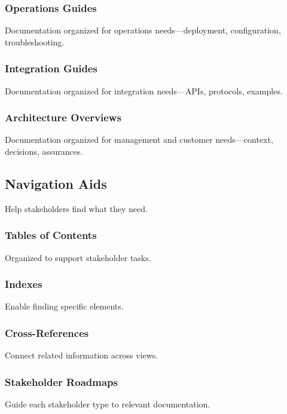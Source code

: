 \documentclass[11pt]{article}
\begin{document}
\subsubsection{Operations Guides}

Documentation organized for operations needs---deployment, configuration, troubleshooting.

\subsubsection{Integration Guides}

Documentation organized for integration needs---APIs, protocols, examples.

\subsubsection{Architecture Overviews}

Documentation organized for management and customer needs---context, decisions, assurances.

\subsection{Navigation Aids}

Help stakeholders find what they need.

\subsubsection{Tables of Contents}

Organized to support stakeholder tasks.

\subsubsection{Indexes}

Enable finding specific elements.

\subsubsection{Cross-References}

Connect related information across views.

\subsubsection{Stakeholder Roadmaps}

Guide each stakeholder type to relevant documentation.
\end{document}

